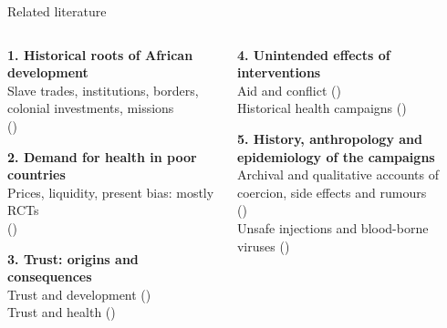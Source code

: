 \documentclass[aspectratio=1610]{beamer}
\newcommand{\refs}[1]{{\footnotesize\color{softgray}(\citealp{#1})}} %
\begin{document}
\begin{frame}{Related literature}
  \small
  \begin{columns}[T]
    \begin{column}{0.49\textwidth}
      \textbf{1. Historical roots of African development}\\
      Slave trades, institutions, borders, colonial investments, missions\\
      \refs{nunn_2008,nunn_2009,gennaioli_rainer_2007,huillery_2009,michalopoulos_papaioannou_2013,michalopoulos_papaioannou_2016,alsan_2015,cage_rueda_2020,anderson_2018}

      \vspace{0.45em}
      \textbf{2. Demand for health in poor countries}\\
      Prices, liquidity, present bias: mostly RCTs\\
      \refs{dupas_2011,banerjee_etal_2010,dupas_miguel_2017}

      \vspace{0.45em}
      \textbf{3. Trust: origins and consequences}\\
      Trust and development \refs{algan_cahuc_2010,nunn_wantchekon_2011}\\
      Trust and health \refs{alsan_wanamaker_2018,alsan_garrick_graziani_2019,martinez_bravo_stegmann_2022}
    \end{column}
    \begin{column}{0.49\textwidth}
      \textbf{4. Unintended effects of interventions}\\
      Aid and conflict \refs{nunn_qian_2014,crost_etal_2014,dube_naidu_2015}\\
      Historical health campaigns \refs{acemoglu_johnson_2007,kazianga_etal_2014}

      \vspace{0.7em}
      \textbf{5. History, anthropology and epidemiology of the campaigns}\\
      Archival and qualitative accounts of coercion, side effects and rumours\\
      \refs{headrick_1994,feldman_etal_2000,giles_vernick_2002,lachenal_2014,lachenal_2017}\\
      Unsafe injections and blood-borne viruses \refs{pepin_labbe_2008,pepin_2011}
    \end{column}
  \end{columns}
\end{frame}
\end{document}
